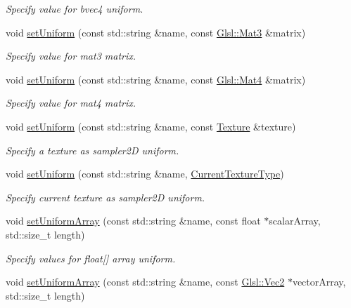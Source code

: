 \begin{DoxyCompactItemize}
\begin{DoxyCompactList}\small\item\em Specify value for {\ttfamily bvec4} uniform. \end{DoxyCompactList}\item 
void \hyperlink{classsf_1_1_shader_ac1198ae0152d439bc05781046883e281}{set\+Uniform} (const std\+::string \&name, const \hyperlink{structsf_1_1priv_1_1_matrix}{Glsl\+::\+Mat3} \&matrix)
\begin{DoxyCompactList}\small\item\em Specify value for {\ttfamily mat3} matrix. \end{DoxyCompactList}\item 
void \hyperlink{classsf_1_1_shader_aca5c55c4a3b23d21e33dbdaab7990755}{set\+Uniform} (const std\+::string \&name, const \hyperlink{structsf_1_1priv_1_1_matrix}{Glsl\+::\+Mat4} \&matrix)
\begin{DoxyCompactList}\small\item\em Specify value for {\ttfamily mat4} matrix. \end{DoxyCompactList}\item 
void \hyperlink{classsf_1_1_shader_a7806a29ffbd0ee9251256a9e7265d479}{set\+Uniform} (const std\+::string \&name, const \hyperlink{classsf_1_1_texture}{Texture} \&texture)
\begin{DoxyCompactList}\small\item\em Specify a texture as {\ttfamily sampler2D} uniform. \end{DoxyCompactList}\item 
void \hyperlink{classsf_1_1_shader_ab18f531e1f726b88fec1cf5a1e6af26d}{set\+Uniform} (const std\+::string \&name, \hyperlink{structsf_1_1_shader_1_1_current_texture_type}{Current\+Texture\+Type})
\begin{DoxyCompactList}\small\item\em Specify current texture as {\ttfamily sampler2D} uniform. \end{DoxyCompactList}\item 
void \hyperlink{classsf_1_1_shader_a731d3b9953c50fe7d3fb03340b97deff}{set\+Uniform\+Array} (const std\+::string \&name, const float $\ast$scalar\+Array, std\+::size\+\_\+t length)
\begin{DoxyCompactList}\small\item\em Specify values for {\ttfamily float}\mbox{[}\mbox{]} array uniform. \end{DoxyCompactList}\item 
void \hyperlink{classsf_1_1_shader_ab2e2eab45d9a091f3720c0879a5bb026}{set\+Uniform\+Array} (const std\+::string \&name, const \hyperlink{namespacesf_1_1_glsl_adeed356d346d87634b4c197a530e4edf}{Glsl\+::\+Vec2} $\ast$vector\+Array, std\+::size\+\_\+t length)

\end{DoxyCompactItemize}
